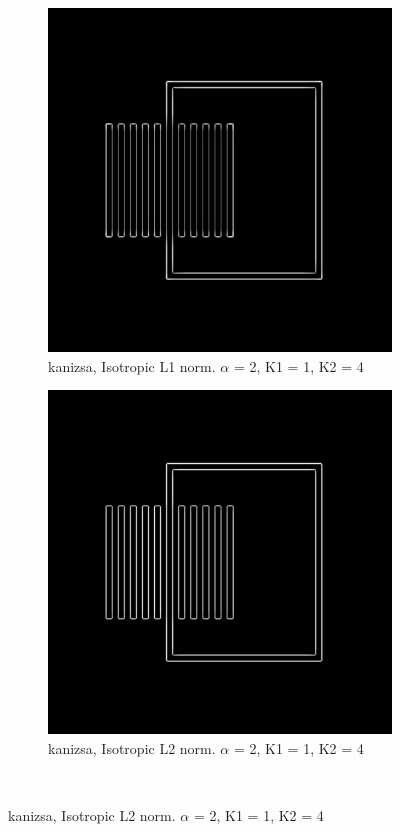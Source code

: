 \begin{figure}[H]
\centering

  \begin{subfigure}{.7\textwidth}
    \centering
    \includegraphics[width=.9\textwidth]{./canny/kanizsa_L1_a2_k11_k24}
    \caption{kanizsa, Isotropic L1 norm. $\alpha$ = 2, K1 = 1, K2 = 4}
    \label{fig:kanizsa_L1_a2_k11_k24}
  \end{subfigure}%
  
  \begin{subfigure}{.7\textwidth}
    \centering
    \includegraphics[width=.9\textwidth]{./canny/kanizsa_L2_a2_k11_k24}
    \caption{kanizsa, Isotropic L2 norm. $\alpha$ = 2, K1 = 1, K2 = 4}
    \label{fig:kanizsa_L2_a2_k11_k24}
  \end{subfigure}\\%
 \end{figure}

